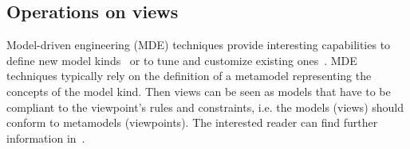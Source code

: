 %
%
%
%
%
%
%
%
%
%
%
%


\subsection{Operations on views}\label{Opns}

Model-driven engineering (MDE) techniques provide interesting capabilities to define new model kinds~\cite{IEEESoftwarePatrizio} or to tune and customize existing ones~\cite{ICSE2010}. 
MDE techniques typically rely on the definition of a metamodel representing the concepts of the model kind.
Then views can be seen as models that have to be compliant 
to the viewpoint's rules and constraints, i.e. the models (views) should conform to metamodels (viewpoints). The interested reader can find further information in~\cite{MEGAF2010,MEGAF2012}.


